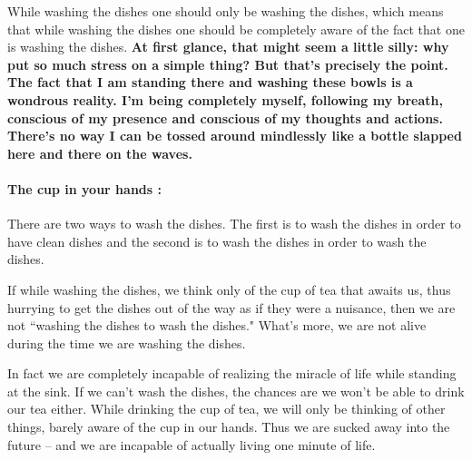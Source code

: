 \documentclass[a4paper,12pt]{article}
\begin{document}
While washing the dishes one should only be washing the dishes, which means that 
while washing the dishes one should be completely aware of the fact that one is 
washing the dishes. \textbf{At first glance, that might seem a little silly: why put so 
much stress on a simple thing? But that’s precisely the point. The fact that I 
am standing there and washing these bowls is a wondrous 
reality. I'm being completely myself, following my breath, conscious of my 
presence and conscious of my thoughts and actions. There's no way I can be 
tossed around mindlessly like a bottle slapped here and there on the waves.}


\paragraph{The cup in your hands :} There are two ways to wash the dishes. 
The first is to wash the dishes in order to have clean dishes and the second is 
to wash the dishes in order to wash the dishes. 

If while washing the dishes, we think only of the cup of tea that awaits us, 
thus hurrying to get the dishes out of the way as if they were a nuisance, then 
we are not ``washing the dishes to wash the dishes." What's more, we are not 
alive during the time we are washing the dishes.

In fact we are completely incapable of realizing the miracle of life while 
standing at the sink. If we can't wash the dishes, the chances are we won't be 
able to drink our tea either. While drinking the cup of tea, we will only be 
thinking of other things, barely aware of the cup in our hands. Thus we are 
sucked away into the future \--- and we are incapable of actually living one 
minute of life.
\end{document}
